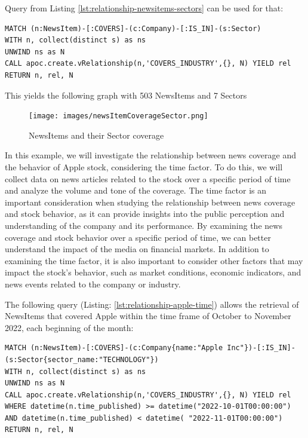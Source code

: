 \noindent Query from Listing \ref{lst:relationship-newsitems-sectors} can be used for that:

\begin{lstlisting}[caption={Relationship between NewsItems and Sectors},label={lst:relationship-newsitems-sectors},captionpos=b]
MATCH (n:NewsItem)-[:COVERS]-(c:Company)-[:IS_IN]-(s:Sector)
WITH n, collect(distinct s) as ns
UNWIND ns as N
CALL apoc.create.vRelationship(n,'COVERS_INDUSTRY',{}, N) YIELD rel
RETURN n, rel, N
\end{lstlisting}

\noindent This yields the following graph with 503 NewsItems and 7 Sectors

\begin{figure}[h]
 \centering
 \texttt{[image: images/newsItemCoverageSector.png]}
 \caption{NewsItems and their Sector coverage }
 \label{fig:newsitems-sector-coverage}
\end{figure}

In this example, we will investigate the relationship between news coverage and the behavior of Apple stock, considering the time factor. To do this, we will collect data on news articles related to the stock over a specific period of time and analyze the volume and tone of the coverage. 
The time factor is an important consideration when studying the relationship between news coverage and stock behavior, as it can provide insights into the public perception and understanding of the company and its performance. By examining the news coverage and stock behavior over a specific period of time, we can better understand the impact of the media on financial markets. In addition to examining the time factor, it is also important to consider other factors that may impact the stock's behavior, such as market conditions, economic indicators, and news events related to the company or industry. \cite{2107087294:online}

\newpage
\noindent The following query (Listing: \ref{lst:relationship-apple-time}) allows the retrieval of NewsItems that covered Apple within the time frame of October to November 2022, each beginning of the month:\\

\begin{lstlisting}[caption={Relationship of NewsItems to Apple Stock october till november}, label={lst:relationship-apple-time},captionpos=b]
MATCH (n:NewsItem)-[:COVERS]-(c:Company{name:"Apple Inc"})-[:IS_IN]-(s:Sector{sector_name:"TECHNOLOGY"})
WITH n, collect(distinct s) as ns
UNWIND ns as N
CALL apoc.create.vRelationship(n,'COVERS_INDUSTRY',{}, N) YIELD rel
WHERE datetime(n.time_published) >= datetime("2022-10-01T00:00:00") AND datetime(n.time_published) < datetime( "2022-11-01T00:00:00")
RETURN n, rel, N
\end{lstlisting}

